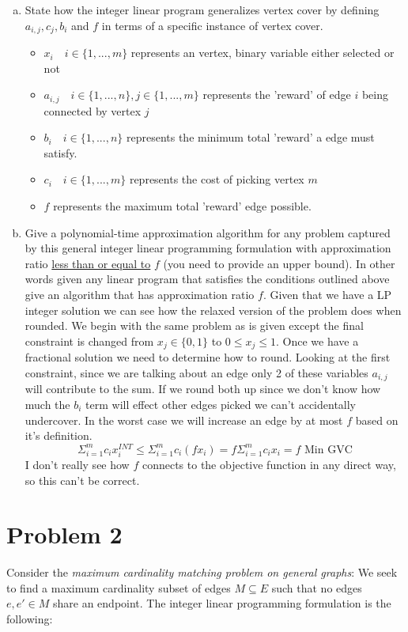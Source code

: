 \documentclass{article}
\begin{document}
\begin{enumerate}[a.]
\item State how the integer linear program generalizes vertex cover by defining $a_{i,j},c_j,b_i$ and $f$ in terms of a specific instance of vertex cover.
\begin{itemize}
\item $x_i \quad i \in \{1,...,m\}$ represents an vertex, binary variable either selected or not
\item $a_{i,j} \quad i \in \{1,...,n\}, j \in \{1,...,m\}$ represents the 'reward' of edge $i$ being connected by vertex $j$
\item $b_{i} \quad i \in \{1,...,n\}$ represents the minimum total 'reward' a edge must satisfy.
\item $c_{i} \quad i \in \{1,...,m\}$ represents the cost of picking vertex $m$
\item $f$ represents the maximum total 'reward' edge possible.
\end{itemize}

\item Give a polynomial-time approximation algorithm for any problem captured by this general integer linear programming formulation with approximation ratio \underline{less than or equal to} $f$ (you need to provide an upper bound).
In other words given any linear program that satisfies the conditions outlined above give an algorithm that has approximation ratio $f$.
\newline
Given that we have a LP integer solution we can see how the relaxed version of the problem does when rounded.
We begin with the same problem as is given except the final constraint is changed from $x_j \in \{0,1\}$ to $ 0 \leq x_j \leq 1$.
Once we have a fractional solution we need to determine how to round.
Looking at the first constraint, since we are talking about an edge only 2 of these variables $a_{i,j}$ will contribute to the sum.
If we round both up since we don't know how much the $b_i$ term will effect other edges picked we can't accidentally undercover.
In the worst case we will increase an edge by at most $f$ based on it's definition.
$$\Sigma_{i=1}^m c_ix_i^{INT} \leq \Sigma_{i=1}^m c_i(f x_i) = f\Sigma_{i=1}^m c_ix_i = f \text{ Min GVC} $$
I don't really see how $f$ connects to the objective function in any direct way, so this can't be correct.
\end{enumerate}


\newpage
\section*{Problem 2}
Consider the \emph{maximum cardinality matching problem on general graphs}:
We seek to find a maximum cardinality subset of edges $M \subseteq E$ such that no edges $e, e' \in M$ share an endpoint.
The integer linear programming formulation is the following:
\end{document}

